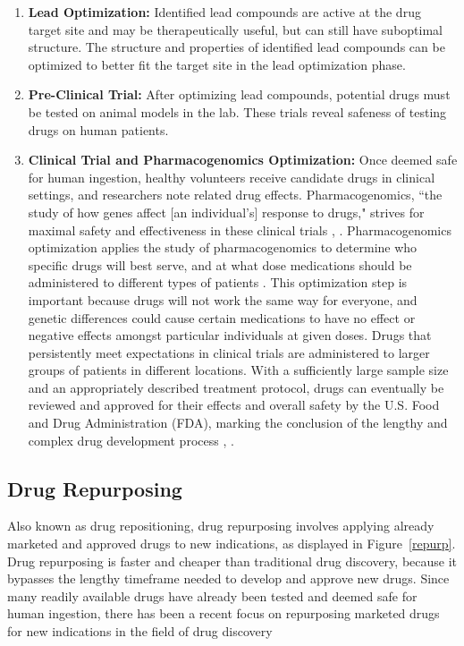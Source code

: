 \documentclass{IEEEtran}
\begin{document}
\begin{enumerate}
			\item \textbf{Lead Optimization:} Identified lead compounds are active at the drug target site and may be therapeutically useful, but can still have suboptimal structure.  The structure and properties of identified lead compounds can be optimized to better fit the target site in the lead optimization phase.
			\item \textbf{Pre-Clinical Trial:} After optimizing lead compounds, potential drugs must be tested on animal models in the lab.  These trials reveal safeness of testing drugs on human patients. 
			\item \textbf{Clinical Trial and Pharmacogenomics Optimization:} Once deemed safe for human ingestion, healthy volunteers receive candidate drugs in clinical settings, and researchers note related drug effects.  Pharmacogenomics, ``the study of how genes affect [an individual's] response to drugs," strives for maximal safety and effectiveness in these clinical trials \cite{nih}, \cite{surend}.   Pharmacogenomics optimization applies the study of pharmacogenomics to determine who specific drugs will best serve, and at what dose medications should be administered to different types of patients \cite{surend}. This optimization step is important because drugs will not work the same way for everyone, and genetic differences could cause certain medications to have no effect or negative effects amongst particular individuals at given doses.   Drugs that persistently meet expectations in clinical trials are administered to larger groups of patients in different locations.  With a sufficiently large sample size and an appropriately described treatment protocol, drugs can eventually be reviewed and approved for their effects and overall safety by the U.S. Food and Drug Administration (FDA), marking the conclusion of the lengthy and complex drug development process \cite{hughes}, \cite{nih}.
		\end{enumerate}
		\subsection{Drug Repurposing} \label{drugrepurp}
		Also known as drug repositioning, drug repurposing involves applying already marketed and approved drugs to new indications, as displayed in Figure~\ref{repurp}. Drug repurposing is faster and cheaper than traditional drug discovery, because it bypasses the lengthy timeframe needed to develop and approve new drugs.  Since many readily available drugs have already been tested and deemed safe for human ingestion, there has been a recent focus on repurposing marketed drugs for new indications in the field of drug discovery~\cite{boguski}
		
\end{document}
